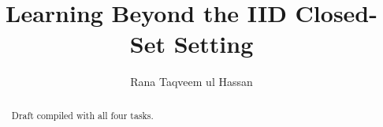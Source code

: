\documentclass{article}
\title{Learning Beyond the IID Closed-Set Setting}
\author{Rana Taqveem ul Hassan}
\begin{document}
\maketitle

\begin{abstract}
Draft compiled with all four tasks.
\end{abstract}



\FloatBarrier


\FloatBarrier


\FloatBarrier



\end{document}
